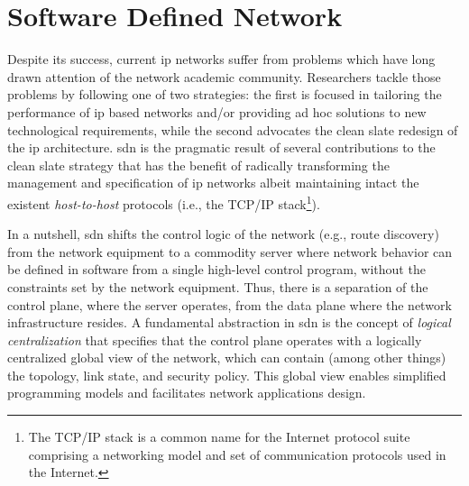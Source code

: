 


\section{Software Defined Network}
Despite its success, current \gls{ip} networks suffer from problems which have long drawn attention of the network academic community. 
Researchers tackle those problems by following one of two strategies: the first is focused in tailoring the performance of \gls{ip}  based networks and/or providing ad hoc solutions to new technological requirements, while the second  advocates the clean slate redesign of the \gls{ip} architecture. 
\gls{sdn} is the pragmatic result of several contributions to the clean slate strategy that has the benefit of radically transforming the management and specification of \gls{ip} networks albeit maintaining intact the existent \emph{host-to-host} protocols (i.e., the TCP/IP stack\footnote{The TCP/IP stack is a common name for the Internet protocol suite comprising a networking model and set of communication protocols used in the Internet.}). 


In a nutshell, \gls{sdn} shifts the control logic of the network (e.g., route discovery) from the network equipment to a commodity server where network behavior can be defined in software from a single high-level control program, without the constraints set by the network equipment. Thus, there is a separation of the control plane, where the server operates, from the  data plane where the network infrastructure resides. 
A fundamental abstraction in \gls{sdn} is the concept of \emph{logical centralization} that specifies that the control plane operates with a logically centralized global view of the network, which can contain (among other things)  the topology, link state, and security policy. 
This global view enables simplified programming models and facilitates network applications design.

